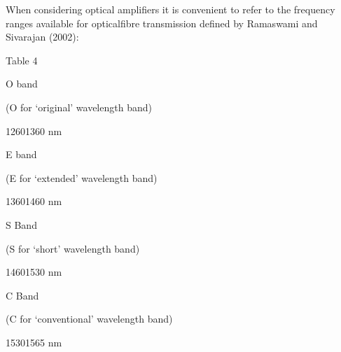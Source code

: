 \documentclass[letterpaper,10pt,english]{sphinxmanual}
\begin{document}
When considering optical amplifiers it is convenient to refer to the frequency ranges available for optical\sphinxhyphen{}fibre transmission defined by Ramaswami and Sivarajan (2002):





Table 4









O band





(O for ‘original’ wavelength band)





1260\textendash{}1360 nm









E band





(E for ‘extended’ wavelength band)





1360\textendash{}1460 nm









S Band





(S for ‘short’ wavelength band)





1460\textendash{}1530 nm









C Band





(C for ‘conventional’ wavelength band)





1530\textendash{}1565 nm
\end{document}
